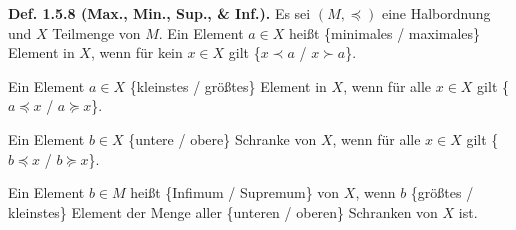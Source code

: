\textbf{Def. 1.5.8 (Max., Min., Sup., \& Inf.).} Es sei $(M,\preceq)$ eine Halbordnung und $X$ Teilmenge von $M$. Ein Element $a\in X$ heißt \{minimales / maximales\} Element in $X$, wenn für kein $x\in X$ gilt \{$x\prec a$ / $x \succ a$\}.

Ein Element $a \in X$ \{kleinstes / größtes\} Element in $X$, wenn für alle $x \in X$ gilt \{$a \preceq x$ / $a \succeq x$\}.

Ein Element $b \in X$ \{untere / obere\} Schranke von $X$, wenn für alle $x \in X$ gilt \{$b \preceq x$ / $b \succeq x$\}.

Ein Element $ b \in M$ heißt \{Infimum / Supremum\} von $X$, wenn $b$ \{größtes / kleinstes\} Element der Menge aller \{unteren / oberen\} Schranken von $X$ ist.

